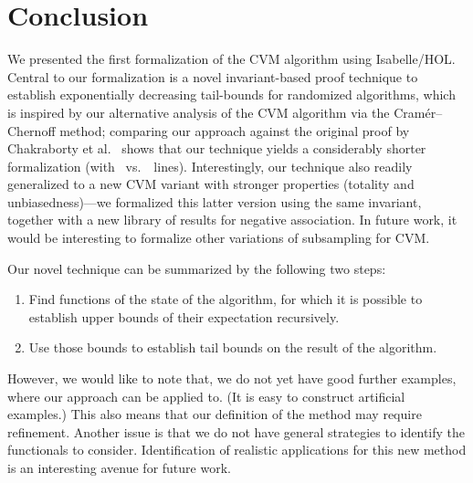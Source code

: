 \section{Conclusion}\label{sec:conclusion}
We presented the first formalization of the CVM algorithm using Isabelle/HOL.
Central to our formalization is a novel invariant-based proof technique to establish exponentially decreasing tail-bounds for randomized algorithms, which is inspired by our alternative analysis of the CVM algorithm via the Cram\'{e}r--Chernoff method; comparing our approach against the original proof by Chakraborty et al.~\cite{chakraborty2023} shows that our technique yields a considerably shorter formalization (with \locnew~vs.~\locold~lines).
Interestingly, our technique also readily generalized to a new CVM variant with stronger properties (totality and unbiasedness)---we formalized this latter version using the same invariant, together with a new library of results for negative association.
In future work, it would be interesting to formalize other variations of subsampling for CVM.

Our novel technique can be summarized by the following two steps:
\begin{enumerate}
\item Find functions of the state of the algorithm, for which it is possible to establish upper bounds of their expectation recursively. 
\item Use those bounds to establish tail bounds on the result of the algorithm.
\end{enumerate}
However, we would like to note that, we do not yet have good further examples, where our approach can be applied to. (It is easy to construct artificial examples.)
This also means that our definition of the method may require refinement.
Another issue is that we do not have general strategies to identify the functionals to consider.
Identification of realistic applications for this new method is an interesting avenue for future work.
